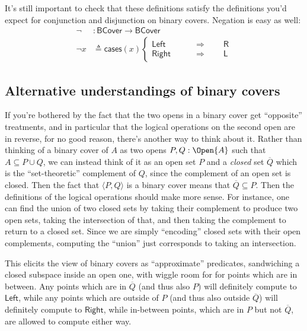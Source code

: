 It's still important to check that these definitions satisfy the definitions you'd expect for conjunction and disjunction on binary covers. Negation is easy as well:
\begin{align*}
 \neg &: \mathsf{BCover} \to \mathsf{BCover}
\\ \neg x &\triangleq \mathsf{cases}(x)
\begin{cases}
\mathsf{Left}
 \qquad &\Rightarrow \qquad
 \mathsf{R}
\\
\mathsf{Right}
 \qquad &\Rightarrow \qquad
 \mathsf{L}
\end{cases}
\end{align*}

\subsection{Alternative understandings of binary covers}

If you're bothered by the fact that the two opens in a binary cover get ``opposite'' treatments, and in particular that the logical operations on the second open are in reverse, for no good reason, there's another way to think about it. Rather than thinking of a binary cover of $A$ as two opens $P, Q : \Open{A}$ such that $A \subseteq P \cup Q$, we can instead think of it as an open set $P$ and a \emph{closed} set $\overline{Q}$ which is the ``set-theoretic'' complement of $Q$, since the complement of an open set is closed. Then the fact that $\langle P, Q \rangle$ is a binary cover means that $\overline{Q} \subseteq P$. Then the definitions of the logical operations should make more sense. For instance, one can find the union of two closed sets by taking their complement to produce two open sets, taking the intersection of that, and then taking the complement to return to a closed set. Since we are simply ``encoding'' closed sets with their open complements, computing the ``union'' just corresponds to taking an intersection.

This elicits the view of binary covers as ``approximate'' predicates, sandwiching a closed subspace inside an open one, with wiggle room for for points which are in between. Any points which are in $\overline{Q}$ (and thus also $P$) will definitely compute to $\mathsf{Left}$, while any points which are outside of $P$ (and thus also outside $\overline{Q}$) will definitely compute to $\mathsf{Right}$, while in-between points, which are in $P$ but not $\overline{Q}$, are allowed to compute either way.

